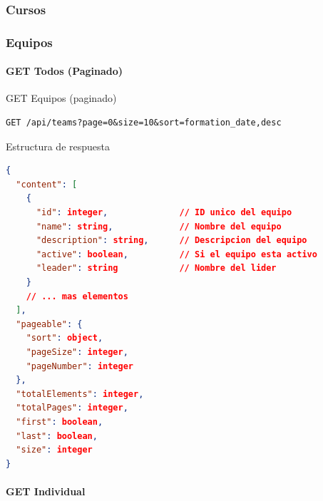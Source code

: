 \documentclass[11pt,a4paper]{article}
\begin{document}

\subsubsection{Cursos}


\subsubsection{Equipos}

\paragraph{GET Todos (Paginado)}

\begin{center}
	\begin{minipage}{\textwidth}
		\begin{codebox}{GET Equipos (paginado)}
			\begin{lstlisting}[language=HTTP]
GET /api/teams?page=0&size=10&sort=formation_date,desc
\end{lstlisting}
		\end{codebox}
	\end{minipage}
\end{center}

\begin{center}
	\begin{minipage}{\textwidth}
		\begin{codebox}{Estructura de respuesta}
			\begin{lstlisting}[language=json]
{
  "content": [
    {
      "id": integer,              // ID unico del equipo
      "name": string,             // Nombre del equipo
      "description": string,      // Descripcion del equipo
      "active": boolean,          // Si el equipo esta activo
      "leader": string            // Nombre del lider
    }
    // ... mas elementos
  ],
  "pageable": {
    "sort": object,
    "pageSize": integer,
    "pageNumber": integer
  },
  "totalElements": integer,
  "totalPages": integer,
  "first": boolean,
  "last": boolean,
  "size": integer
}
\end{lstlisting}
		\end{codebox}
	\end{minipage}
\end{center}

\paragraph{GET Individual}
\end{document}
